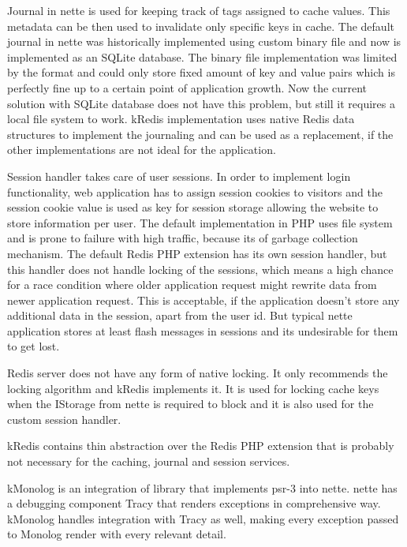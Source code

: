 Journal in \gls{nette} is used for keeping track of tags assigned to cache values. This metadata can be then used to invalidate only specific keys in cache. The default journal in \gls{nette} was historically implemented using custom binary file and now is implemented as an SQLite database. The binary file implementation was limited by the format and could only store fixed amount of key and value pairs which is perfectly fine up to a certain point of application growth. Now the current solution with SQLite database does not have this problem, but still it requires a local file system to work. \gls{kRedis} implementation uses native Redis data structures to implement the journaling and can be used as a replacement, if the other implementations are not ideal for the application.

Session handler takes care of user sessions. In order to implement login functionality, web application has to assign session cookies to visitors and the session cookie value is used as key for session storage allowing the website to store information per user. The default implementation in PHP uses file system and is prone to failure with high traffic, because its of garbage collection mechanism. The default Redis PHP extension has its own session handler, but this handler does not handle locking of the sessions, which means a high chance for a race condition where older application request might rewrite data from newer application request. This is acceptable, if the application doesn't store any additional data in the session, apart from the user id. But typical \gls{nette} application stores at least flash messages in sessions and its undesirable for them to get lost.

Redis server does not have any form of native locking. It only recommends the locking algorithm  and \gls{kRedis} implements it.
It is used for locking cache keys when the IStorage from \gls{nette} is required to block and it is also used for the custom session handler.

\gls{kRedis} contains thin abstraction over the Redis PHP extension that is probably not necessary for the caching, journal and session services.

 \label{sec:state:monolog}

\gls{kMonolog} is an integration of  library that implements \gls{psr}-3 into \gls{nette}. \Gls{nette} has a debugging component Tracy that renders exceptions in comprehensive way. \gls{kMonolog} handles integration with Tracy as well, making every exception passed to Monolog render with every relevant detail.

